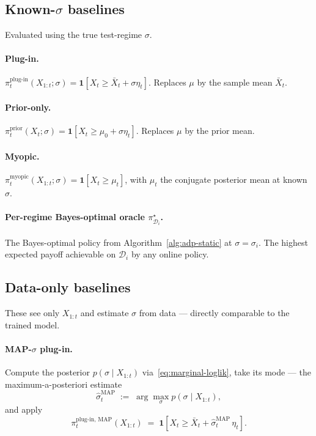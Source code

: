 \documentclass[11pt]{article}
\begin{document}
\subsection{Known-$\sigma$ baselines}

Evaluated using the true test-regime $\sigma$.

\paragraph{Plug-in.} $\pi_t^{\mathrm{plug\text{-}in}}(X_{1:t}; \sigma) = \mathbf{1}[X_t \ge \bar X_t + \sigma\eta_t]$. Replaces $\mu$ by the sample mean $\bar X_t$.

\paragraph{Prior-only.} $\pi_t^{\mathrm{prior}}(X_t; \sigma) = \mathbf{1}[X_t \ge \mu_0 + \sigma\eta_t]$. Replaces $\mu$ by the prior mean.

\paragraph{Myopic.} $\pi_t^{\mathrm{myopic}}(X_{1:t}; \sigma) = \mathbf{1}[X_t \ge \mu_t]$, with $\mu_t$ the conjugate posterior mean at known $\sigma$.

\paragraph{Per-regime Bayes-optimal oracle $\pi^\star_{\mathcal{D}_i}$.} The Bayes-optimal policy from Algorithm~\ref{alg:adp-static} at $\sigma = \sigma_i$. The highest expected payoff achievable on $\mathcal{D}_i$ by any online policy.

\subsection{Data-only baselines}

These see only $X_{1:t}$ and estimate $\sigma$ from data --- directly comparable to the trained model.

\paragraph{MAP-$\sigma$ plug-in.} Compute the posterior $p(\sigma \mid X_{1:t})$ via~\eqref{eq:marginal-loglik}, take its mode --- the maximum-a-posteriori estimate
\[
\hat\sigma_t^{\mathrm{MAP}} \;:=\; \arg\max_\sigma p(\sigma \mid X_{1:t}),
\]
and apply
\[
\pi_t^{\mathrm{plug\text{-}in,\,MAP}}(X_{1:t}) \;=\; \mathbf{1}[X_t \ge \bar X_t + \hat\sigma_t^{\mathrm{MAP}}\, \eta_t].
\]
\end{document}
